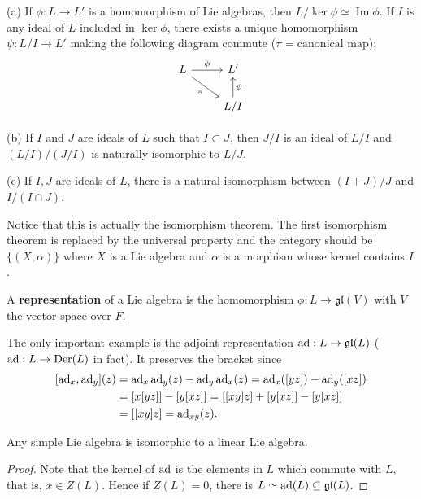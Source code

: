 \begin{proposition}
(a) If $\phi : L \to L'$ is a homomorphism of Lie algebras, then $L/\operatorname{ker} \phi \simeq \operatorname{Im} \phi$. If $I$ is any ideal of $L$ included in $\operatorname{ker} \phi$, there exists a unique homomorphism $\psi : L/I \to L'$ making the following diagram commute ($\pi = \text{canonical map}$):
\[
\begin{tikzcd}
L \arrow[r, "\phi"] \arrow[dr, "\pi"'] & L' \\
& L/I \arrow[u, "\psi"']
\end{tikzcd}
\]

(b) If $I$ and $J$ are ideals of $L$ such that $I \subset J$, then $J/I$ is an ideal of $L/I$ and $(L/I)/(J/I)$ is naturally isomorphic to $L/J$.

(c) If $I, J$ are ideals of $L$, there is a natural isomorphism between $(I+J)/J$ and $I/(I \cap J)$. 
\end{proposition}
\begin{remark}
    Notice that this is actually the isomorphism theorem. The first isomorphism theorem is replaced by the universal property and the category should be $\{(X,\alpha)\}$ where $X$ is a Lie algebra and $\alpha$ is a morphism whose kernel contains $I$.
\end{remark}

\begin{definition}
    A \textbf{representation} of a Lie algebra is the homomorphism $\phi:L\to \mathfrak{gl}(V)$ with $V$ the vector space over $F$.
\end{definition}
\begin{remark}
    The only important example is the adjoint representation $\operatorname{ad}:L\to \mathfrak{gl}(L)$ ($\operatorname{ad}:L\to \operatorname{Der}(L)$ in fact). It preserves the bracket since 
    $$\begin{aligned}
    \relax [\operatorname{ad}_x,\operatorname{ad}_y](z) &=\operatorname{ad}_x\operatorname{ad}_y(z)-\operatorname{ad}_y\operatorname{ad}_x(z)=\operatorname{ad}_x([yz])-\operatorname{ad}_y([xz]) \\ 
    &=[x[yz]]-[y[xz]]=[[xy]z]+[y[xz]]-[y[xz]]\\
    &=[[xy]z]=\operatorname{ad}_{xy}(z).
    \end{aligned}$$
\end{remark}

\begin{proposition}
    Any simple Lie algebra is isomorphic to a linear Lie algebra.
\end{proposition}
\begin{proof}
    Note that the kernel of $\operatorname{ad}$ is the elements in $L$ which commute with $L$, that is, $x \in Z(L)$. Hence if $Z(L)=0$, there is $L\simeq \operatorname{ad}(L) \subseteq \mathfrak{gl}(L)$.
\end{proof}

